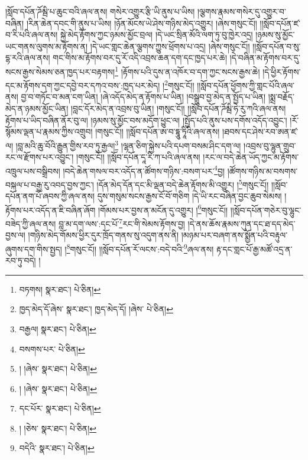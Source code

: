 །སློབ་དཔོན་ཌོམྦི་པ་ཆུང་བའི་ཞལ་ནས། གསེར་འགྱུར་རྩི་ཡི་ནུས་པ་ཡིས། །ལྕགས་རྣམས་གསེར་དུ་འགྱུར་བ་བཞིན། །རིན་ཆེན་དབང་གི་ནུས་པ་ཡིས། །ཉོན་མོངས་ཡེ་ཤེས་གཉིས་མེད་འགྱུར། །ཞེས་གསུང་ངོ།། །།སློབ་དཔོན་ཛ་བ་རི་པའི་ཞལ་ནས། སྐྱེ་མེད་རྟོགས་ཀྱང་ཉམས་མྱོང་བྲལ། །དེ་ཡང་སྲིན་མོའི་ལག་ཏུ་བུ་ཁྱེར་འདྲ། །ཉམས་སུ་མྱོང་ཡང་གནས་ལུགས་མ་རྟོགས་ན། །དེ་ཡང་གླང་ཆེན་ལྕགས་ཀྱུས་ཕྲོགས་པ་འདྲ། །ཞེས་གསུང་ངོ།། །།སློབ་དཔོན་བ་སུ་དྷ་རའི་ཞལ་ནས། གང་གིས་མ་རྟོགས་བར་དུ་རོ་འདི་འབྲས་ཆན་དག་དང་ཁྱད་པར་ཆེ། །དེ་བཞིན་མ་རྟོགས་བར་དུ་སངས་རྒྱས་སེམས་ཅན་ཁྱད་པར་བརྟགས།\footnote{བཏགས།  སྣར་ཐང་།  པེ་ཅིན། } །རྟོགས་པའི་དུས་ན་འཁོར་བ་དག་ཀྱང་སངས་རྒྱས་ཆེ། །དེ་ཕྱིར་རྟོགས་དང་མ་རྟོགས་དག་ཀྱང་དབྱེ་བར་དཀའ་བས་:ཁྱད་པར་མེད། །\footnote{ཁྱད་མེད་དོ་ཞེས་  སྣར་ཐང་། ཁྱད་མེད་དོ། །ཞེས་  པེ་ཅིན། }གསུང་ངོ།། །།སློབ་དཔོན་ཕྱོགས་ཀྱི་གླང་པོའི་ཞལ་ནས། བྱ་བ་གཏོང་བ་མན་ངག་ཡིན། །ཞེ་འདོད་མེད་ན་རྟོགས་པ་ཡིན། །བསྒྲུབ་བྱ་མེད་ན་སྤྱོད་པ་ཡིན། །སྨྲ་བརྗོད་མེད་ན་ཉམས་མྱོང་ཡིན། །བླང་དོར་མེད་ན་འབྲས་བུ་ཡིན། །གསུང་ངོ།། །།སློབ་དཔོན་ཌོམྦི་ཧེ་རུ་ཀའི་ཞལ་ནས། རྟོགས་པ་ཡིད་བཞིན་ནོར་བུ་ལ། །ཉམས་སུ་མྱོང་བས་མདོག་ཕྱུང་ལ། །སྤྱོད་པའི་ནུས་པས་དགོས་འདོད་འབྱུང་། །རོ་སྙོམས་ལྡན་པ་རྣམས་ཀྱིས་འགྲུབ། །གསུང་ངོ།། །།སློབ་དཔོན་ཨ་བ་དྷཱུ་ཏཱིའི་ཞལ་ནས། །ཐབས་དང་ཤེས་རབ་ཨན་ཛ་ལ། །བླ་མའི་ཆུ་བོའི་རྒྱུན་གྱིས་རབ་ཏུ་རྒྱལ།\footnote{བརྒྱལ།  སྣར་ཐང་།  པེ་ཅིན། } །ལྷན་ཅིག་སྐྱེས་པའི་དཔག་བསམ་ཤིང་དག་ལ། །འབྲས་བུ་ལྷུན་གྲུབ་རང་ལ་རྫོགས་པར་འབྱུང་། །གསུང་ངོ།། །།སློབ་དཔོན་དཱ་རི་ཀ་པའི་ཞལ་ནས། །རང་ལ་བདེ་ཆེན་ཡོད་ཀྱང་མ་རྟོགས་འཁྲུལ་པས་བསྒྲིབས། །བདེ་ཆེན་གསལ་བར་འདོད་ན་ཚོགས་གཉིས་:བསག་པར་\footnote{བསགས་པར་  པེ་ཅིན། }བྱ། །ཚོགས་གཉིས་མ་བསགས་བསྐལ་པ་བརྒྱ་རུ་འབད་བྱས་ཀྱང་། །དོན་མེད་དོན་དང་མི་ལྡན་བདེ་ཆེན་རྟོགས་མི་འགྱུར། །\footnote{། །ཞེས་  སྣར་ཐང་།  པེ་ཅིན། }གསུང་ངོ།། །།སློབ་དཔོན་ནག་པོ་ཞབས་ཀྱི་ཞལ་ནས། དུས་གསུམ་སངས་རྒྱས་ངོ་བོ་གཅིག །དེ་ཡི་རང་བཞིན་བྱང་ཆུབ་སེམས། །རྟོགས་པར་འདོད་ན་ཇི་བཞིན་ཞོག །གོམས་པར་བྱས་ན་མངོན་དུ་འགྱུར། །\footnote{། །ཞེས་  སྣར་ཐང་།  པེ་ཅིན། }གསུང་ངོ།། །།སློབ་དཔོན་གཅེར་བུ་ལྷུང་བཟེད་ཀྱི་ཞལ་ནས། བླ་མ་དག་ལས་:དང་པོ་\footnote{དང་པོར་  སྣར་ཐང་།  པེ་ཅིན། }རང་གི་སེམས་རྟོགས་བྱ། །དེ་ནས་ཆོས་རྣམས་ཀུན་དང་ཐ་དད་མེད་བྱས་ལ། །གཉིས་མེད་གོམས་ཕྱིར་དུར་ཁྲོད་གནས་སུ་འདུག་ནས་ནི། །མཉམ་པར་བཞག་ནས་སྨྱོན་པའི་བརྟུལ་ཞུགས་དག་གིས་སྤྱད། །\footnote{། །ཅེས་  སྣར་ཐང་།  པེ་ཅིན། }གསུང་ངོ།། །།སློབ་དཔོན་རོ་ལངས་:བདེ་བའི་\footnote{བདེའི་  སྣར་ཐང་།  པེ་ཅིན། }ཞལ་ནས། རྟ་དང་གླང་པོ་རྒྱ་མཚོ་འདྲ་ན་རབ་ཏུ་བདེ། །
